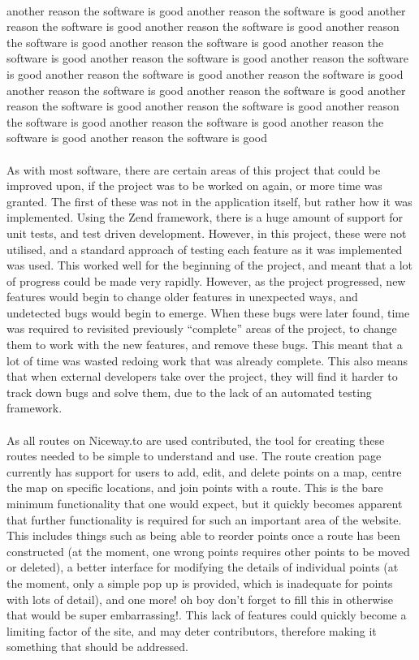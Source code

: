 \ \\
{\color{blue}
another reason the software is good another reason the software is good another reason the software is good another reason the software is good another reason the software is good another reason the software is good another reason the software is good another reason the software is good another reason the software is good another reason the software is good another reason the software is good another reason the software is good another reason the software is good another reason the software is good another reason the software is good another reason the software is good another reason the software is good another reason the software is good another reason the software is good 
}
\ \\
\ \\
As with most software, there are certain areas of this project that could be improved upon, if the project was to be worked on again, or more time was granted. The first of these was not in the application itself, but rather how it was implemented. Using the Zend framework, there is a huge amount of support for unit tests, and test driven development. However, in this project, these were not utilised, and a standard approach of testing each feature as it was implemented was used. This worked well for the beginning of the project, and meant that a lot of progress could be made very rapidly. However, as the project progressed, new features would begin to change older features in unexpected ways, and undetected bugs would begin to emerge. When these bugs were later found, time was required to revisited previously ``complete'' areas of the project, to change them to work with the new features, and remove these bugs. This meant that a lot of time was wasted redoing work that was already complete. This also means that when external developers take over the project, they will find it harder to track down bugs and solve them, due to the lack of an automated testing framework.\ \\
\ \\
As all routes on Niceway.to are used contributed, the tool for creating these routes needed to be simple to understand and use. The route creation page currently has support for users to add, edit, and delete points on a map, centre the map on specific locations, and join points with a route. This is the bare minimum functionality that one would expect, but it quickly becomes apparent that further functionality is required for such an important area of the website. This includes things such as being able to reorder points once a route has been constructed (at the moment, one wrong points requires other points to be moved or deleted), a better interface for modifying the details of individual points (at the moment, only a simple pop up is provided, which is inadequate for points with lots of detail), {\color{red}and one more! oh boy don't forget to fill this in otherwise that would be super embarrassing!}. This lack of features could quickly become a limiting factor of the site, and may deter contributors, therefore making it something that should be addressed.\ \\
